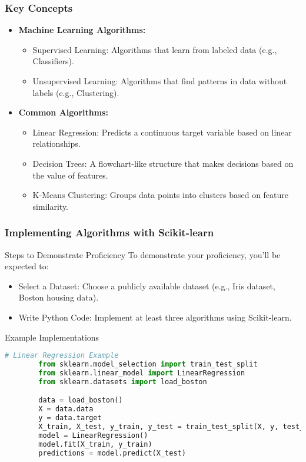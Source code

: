 \documentclass[aspectratio=169]{beamer}
\begin{document}
\begin{frame}[fragile]
    \frametitle{Key Concepts}
    \begin{itemize}
        \item \textbf{Machine Learning Algorithms:}
        \begin{itemize}
            \item Supervised Learning: Algorithms that learn from labeled data (e.g., Classifiers).
            \item Unsupervised Learning: Algorithms that find patterns in data without labels (e.g., Clustering).
        \end{itemize}

        \item \textbf{Common Algorithms:}
        \begin{itemize}
            \item Linear Regression: Predicts a continuous target variable based on linear relationships.
            \item Decision Trees: A flowchart-like structure that makes decisions based on the value of features.
            \item K-Means Clustering: Groups data points into clusters based on feature similarity.
        \end{itemize}
    \end{itemize}
\end{frame}

\begin{frame}[fragile]
    \frametitle{Implementing Algorithms with Scikit-learn}
    \begin{block}{Steps to Demonstrate Proficiency}
        To demonstrate your proficiency, you’ll be expected to:
        \begin{itemize}
            \item Select a Dataset: Choose a publicly available dataset (e.g., Iris dataset, Boston housing data).
            \item Write Python Code: Implement at least three algorithms using Scikit-learn.
        \end{itemize}
    \end{block}

    \begin{block}{Example Implementations}
        \begin{lstlisting}[language=Python]
        # Linear Regression Example
        from sklearn.model_selection import train_test_split
        from sklearn.linear_model import LinearRegression
        from sklearn.datasets import load_boston

        data = load_boston()
        X = data.data
        y = data.target
        X_train, X_test, y_train, y_test = train_test_split(X, y, test_size=0.2, random_state=42)
        model = LinearRegression()
        model.fit(X_train, y_train)
        predictions = model.predict(X_test)
        \end{lstlisting}
    \end{block}
    
\end{frame}
\end{document}
